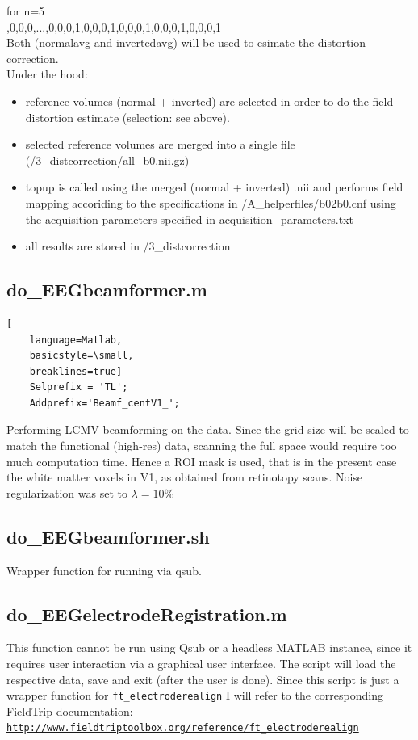 \documentclass[12pt,a4paper]{scrartcl}
\begin{document}
\noindent for n=5\\

,0,0,0,...,0,0,0,1,0,0,0,1,0,0,0,1,0,0,0,1,0,0,0,1\\

\noindent Both (normalavg and invertedavg) will be used to esimate the distortion correction.\\

\noindent Under the hood:
\begin{itemize}
\item reference volumes (normal + inverted) are selected in order to do the field distortion estimate (selection: see above).
\item selected reference volumes are merged into a single file (/3\_distcorrection/all\_b0.nii.gz)
\item topup is called using the merged (normal + inverted) .nii and performs field mapping accoriding to the specifications in /A\_helperfiles/b02b0.cnf using the acquisition parameters specified in acquisition\_parameters.txt
\item all results are stored in /3\_distcorrection
\end{itemize}

\subsection{do\_EEGbeamformer.m}
\label{m:beamf}
\begin{lstlisting}[
    language=Matlab,
    basicstyle=\small,
    breaklines=true]
    Selprefix = 'TL';
    Addprefix='Beamf_centV1_';
\end{lstlisting}
Performing LCMV beamforming on the data. Since the grid size will be scaled to match the functional (high-res) data, scanning the full space would require too much computation time. Hence a ROI mask is used, that is in the present case the white matter voxels in V1, as obtained from retinotopy scans. Noise regularization was set to $\lambda=10\%$\\

\subsection{do\_EEGbeamformer.sh}
\label{sh:beamf}
Wrapper function for running \texttt{} via qsub.\\

\subsection{do\_EEGelectrodeRegistration.m}
\label{m:elecReg}
This function cannot be run using Qsub or a headless MATLAB instance, since it requires user interaction via a graphical user interface. The script will load the respective data, save and exit (after the user is done). Since this script is just a wrapper function for \texttt{ft\_electroderealign} I will refer to the corresponding FieldTrip documentation: \href{http://www.fieldtriptoolbox.org/reference/ft\_electroderealign}{\nolinkurl{http://www.fieldtriptoolbox.org/reference/ft\_electroderealign}}\\
\end{document}
